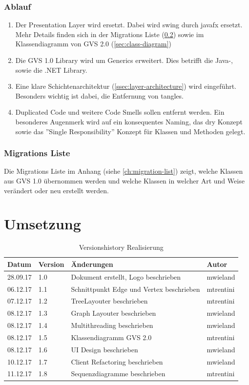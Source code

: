 \documentclass[11pt,a4paper,english,oneside]{book}
\numberwithin{equation}{chapter}
\begin{document}
	\subsection{Ablauf}\label{ssec:ablauf}
	\begin{enumerate}
		\item Der Presentation Layer wird ersetzt. Dabei wird \gls{swing} durch \gls{javafx} ersetzt. Mehr Details finden sich in der Migrations Liste (\ref{ssec:class-refactroing-list}) sowie im Klassendiagramm von GVS 2.0 (\ref{sec:class-diagram})
		\item Die GVS 1.0 Library wird um Generics erweitert. Dies betrifft die Java-, sowie die .NET Library.
		\item Eine klare Schichtenarchitektur (\ref{ssec:layer-architecture}) wird eingeführt. Besonders wichtig ist dabei, die Entfernung von \gls{tangle}s.
		\item Duplicated Code und weitere Code Smells sollen entfernt werden. Ein besonderes Augenmerk wird auf ein konsequentes Naming, das \gls{dry} Konzept sowie das ''Single Responsibility'' Konzept für Klassen und Methoden gelegt.
	\end{enumerate}

	\subsection{Migrations Liste}
	\label{ssec:class-refactroing-list}
	Die Migrations Liste im Anhang (siehe \ref{ch:migration-list}) zeigt, welche Klassen aus GVS 1.0 übernommen werden und welche Klassen in welcher Art und Weise verändert oder neu erstellt werden.

	
	\chapter{Umsetzung}
		
	\begin{table}[h!]
	\centering
	\begin{tabularx}{\linewidth}{l l X l}
		\toprule 
		Datum & Version & Änderungen & Autor \\
		\midrule
		28.09.17 & 1.0 & Dokument erstellt, Logo beschrieben & mwieland \\
		06.12.17 & 1.1 & Schnittpunkt Edge und Vertex beschrieben & mtrentini \\
		07.12.17 & 1.2 & TreeLayouter beschrieben & mtrentini \\
		08.12.17 & 1.3 & Graph Layouter beschrieben & mwieland \\
		08.12.17 & 1.4 & Multithreading beschrieben & mwieland \\
		08.12.17 & 1.5 & Klassendiagramm GVS 2.0 & mtrentini \\
		08.12.17 & 1.6 & UI Design beschrieben & mwieland \\
		10.12.17 & 1.7 & Client Refactoring beschrieben & mwieland \\
		11.12.17 & 1.8 & Sequenzdiagramme beschrieben & mtrentini \\
		\bottomrule 
	\end{tabularx} 
	\caption{Versionshistory Realisierung} 
	\end{table}
\end{document}

